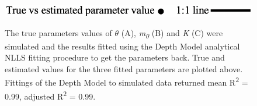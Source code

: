 {%

\begin{figure}[htbp]
\centering
{}
\smallskip

\includegraphics[width=.6\textwidth]{Legend2.png}\\
\caption{The true parameters values of $\theta$ (A), \textit{m\textsubscript{0}} (B) and \textit{K} (C) were simulated and the results fitted using the Depth Model analytical NLLS fitting procedure to get the parameters back. True and estimated values for the three fitted parameters are plotted above. Fittings of the Depth Model to simulated data returned mean R\textsuperscript{2} = 0.99, adjusted R\textsuperscript{2} = 0.99.}
\label{fig:myfig}
\end{figure}

}
